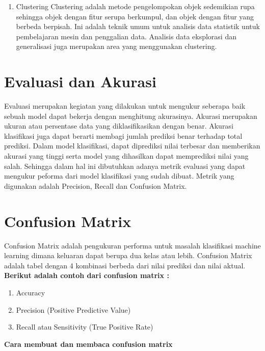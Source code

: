 \begin{enumerate}
        \item Clustering
        \newline Clustering adalah metode pengelompokan objek sedemikian rupa sehingga objek dengan fitur serupa berkumpul, dan objek dengan fitur yang berbeda berpisah. Ini adalah teknik umum untuk analisis data statistik untuk pembelajaran mesin dan penggalian data. Analisis data eksplorasi dan generalisasi juga merupakan area yang menggunakan clustering.
        \end{enumerate}

	\section{Evaluasi dan Akurasi}
	Evaluasi merupakan kegiatan yang dilakukan untuk mengukur seberapa baik sebuah model dapat bekerja dengan menghitung akurasinya. Akurasi merupakan ukuran atau persentase data yang diklasifikasikan dengan benar. Akurasi klasifikasi juga dapat berarti membagi jumlah prediksi benar terhadap total prediksi. Dalam model klasifikasi, dapat diprediksi nilai terbesar dan memberikan akurasi yang tinggi serta model yang dihasilkan dapat memprediksi nilai yang salah. Sehingga dalam hal ini dibutuhkan adanya metrik evaluasi yang dapat mengukur peforma dari model klasifikasi yang sudah dibuat. Metrik yang digunakan adalah Precision, Recall dan Confusion Matrix.

	\section{Confusion Matrix}
	Confusion Matrix adalah pengukuran performa untuk masalah klasifikasi machine learning dimana keluaran dapat berupa dua kelas atau lebih. Confusion Matrix adalah tabel dengan 4 kombinasi berbeda dari nilai prediksi dan nilai aktual.
	\newline 
	\textbf {Berikut adalah contoh dari confusion matrix :}
	\begin{enumerate}
		\item Accuracy
		\item Precision (Positive Predictive Value)
		\item Recall atau Sensitivity (True Positive Rate)
	\end{enumerate}
	\textbf {Cara membuat dan membaca confusion matrix}
	
